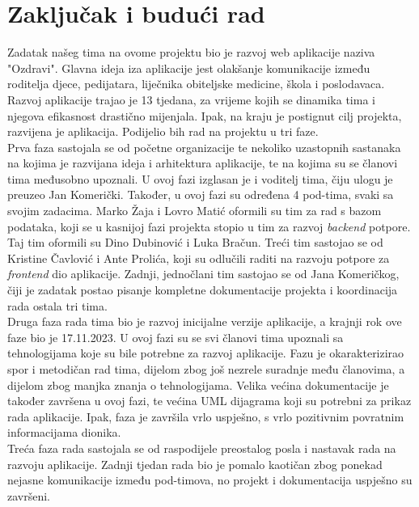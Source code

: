 \chapter{Zaključak i budući rad}
		
		\text Zadatak našeg tima na ovome projektu bio je razvoj web aplikacije naziva "Ozdravi". Glavna ideja iza aplikacije jest olakšanje komunikacije između roditelja djece, pedijatara, liječnika obiteljske medicine, škola i poslodavaca. Razvoj aplikacije trajao je 13 tjedana, za vrijeme kojih se dinamika tima i njegova efikasnost drastično mijenjala. Ipak, na kraju je postignut cilj projekta, razvijena je aplikacija. Podijelio bih rad na projektu u tri faze.\\
		Prva faza sastojala se od početne organizacije te nekoliko uzastopnih sastanaka na kojima je razvijana ideja i arhitektura aplikacije, te na kojima su se članovi tima međusobno upoznali. U ovoj fazi izglasan je i voditelj tima, čiju ulogu je preuzeo Jan Komerički. Također, u ovoj fazi su određena 4 pod-tima, svaki sa svojim zadacima. Marko Žaja i Lovro Matić oformili su tim za rad s bazom podataka, koji se u kasnijoj fazi projekta stopio u tim za razvoj \textit{backend} potpore. Taj tim oformili su Dino Dubinović i Luka Bračun. Treći tim sastojao se od Kristine Čavlović i Ante Prolića, koji su odlučili raditi na razvoju potpore za \textit{frontend} dio aplikacije. Zadnji, jednočlani tim sastojao se od Jana Komeričkog, čiji je zadatak postao pisanje kompletne dokumentacije projekta i koordinacija rada ostala tri tima. \\
		Druga faza rada tima bio je razvoj inicijalne verzije aplikacije, a krajnji rok ove faze bio je 17.11.2023. U ovoj fazi su se svi članovi tima upoznali sa tehnologijama koje su bile potrebne za razvoj aplikacije. Fazu je okarakterizirao spor i metodičan rad tima, dijelom zbog još nezrele suradnje među članovima, a dijelom zbog manjka znanja o tehnologijama. Velika većina dokumentacije je također završena u ovoj fazi, te većina UML dijagrama koji su potrebni za prikaz rada aplikacije. Ipak, faza je završila vrlo uspješno, s vrlo pozitivnim povratnim informacijama dionika.\\
		Treća faza rada sastojala se od raspodijele preostalog posla i nastavak rada na razvoju aplikacije. Zadnji tjedan rada bio je pomalo kaotičan zbog ponekad nejasne komunikacije između pod-timova, no projekt i dokumentacija uspješno su završeni.\\
